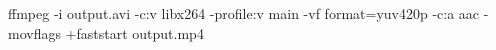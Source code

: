 ffmpeg -i output.avi -c:v libx264 -profile:v main -vf format=yuv420p -c:a aac -movflags +faststart output.mp4

